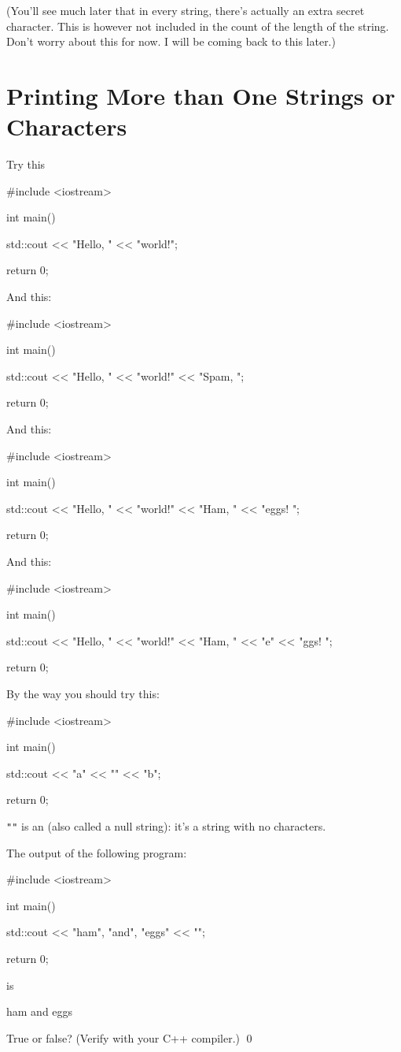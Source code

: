 (You'll see much later that in every string, there's actually an extra secret character. This is however not included in the count of the length of the string. Don't worry about this for now. I will be coming back to this later.)









\newpage\section{Printing More than One Strings or Characters}

Try this
\begin{console}
#include <iostream>

int main()
{
    std::cout << "Hello, " << "world!\n";

    return 0;
}
\end{console}
And this:
\begin{console}
#include <iostream>

int main()
{
	std::cout << "Hello, " << "world!\n"
                  << "Spam, \n";

	return 0;
}
\end{console}
And this:
\begin{console}
#include <iostream>

int main()
{
	std::cout << "Hello, " << "world!\n"
                  << "Ham, " << "eggs! \n";

	return 0;
}
\end{console}
And this:
\begin{console}
#include <iostream>

int main()
{
	std::cout << "Hello, " << "world!\n"
                  << "Ham, " << "e" << "ggs! \n";

	return 0;
}
\end{console}

By the way you should try this:
\begin{console}
#include <iostream>

int main()
{
    std::cout << "a" << "" << "b";

    return 0;
}
\end{console}

\verb!""! 
is an 
(also called a null string): 
it's a string with no characters.


\begin{ex}
The output of the following program:
\begin{console}
#include <iostream>

int main()
{
    std::cout << "ham", "and", "eggs"
              << "\n";
      
    return 0;
}
\end{console}
is
\begin{console}
ham and eggs
\end{console}
True or false? (Verify with your C++ compiler.)
\qed
\end{ex}


